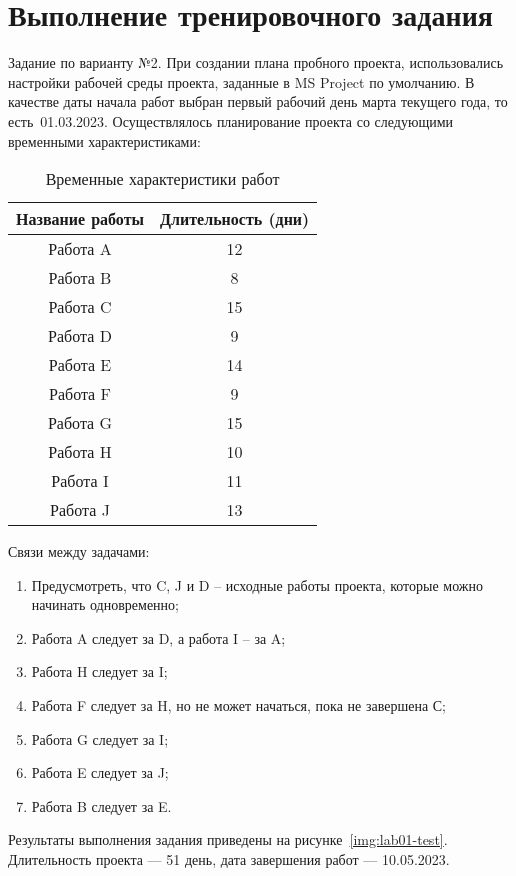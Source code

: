 \chapter{Выполнение тренировочного задания}

Задание по варианту №2. При создании плана пробного проекта, использовались
настройки рабочей среды проекта, заданные в MS Project по умолчанию. В качестве
даты начала работ выбран первый рабочий день марта текущего года, то
есть~01.03.2023. Осуществлялось планирование проекта со следующими временными
характеристиками:

{
\captionsetup{format=hang,justification=raggedleft,
              singlelinecheck=off,width=17cm}
\begin{longtable}[Hc]{|c|c|}
\caption{Временные характеристики работ}\\
    \hline
    Название работы & Длительность (дни)\\
    \hline
    Работа A & 12\\
    \hline
    Работа B & 8\\
    \hline
    Работа C & 15\\
    \hline
    Работа D & 9\\
    \hline
    Работа E & 14\\
    \hline
    Работа F & 9\\
    \hline
    Работа G & 15\\
    \hline
    Работа H & 10\\
    \hline
    Работа I & 11\\
    \hline
    Работа J & 13\\
    \hline
\end{longtable}
}

Связи между задачами:

\begin{enumerate}
    \item Предусмотреть, что C, J и D – исходные работы проекта, которые можно начинать одновременно;
    \item Работа A следует за D, а работа I – за A;
    \item Работа H следует за I;
    \item Работа F следует за H, но не может начаться, пока не завершена С;
    \item Работа G следует за I;
    \item Работа E следует за J;
    \item Работа B следует за E.
\end{enumerate}

Результаты выполнения задания приведены на рисунке~\ref{img:lab01-test}.
Длительность проекта --- 51 день, дата завершения работ --- 10.05.2023.

